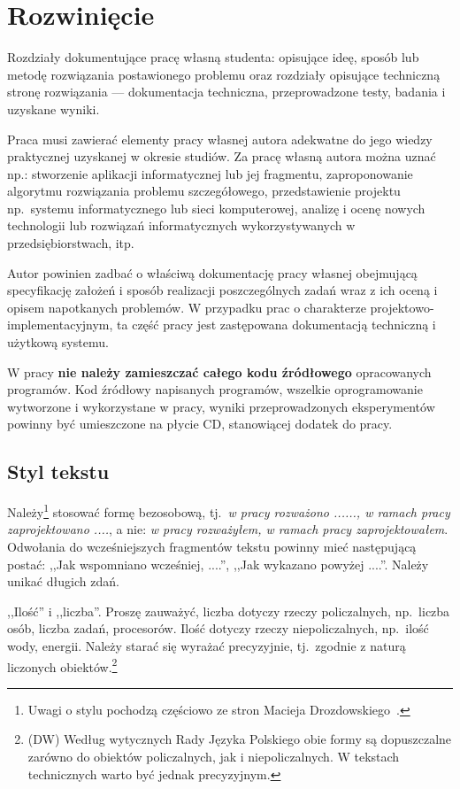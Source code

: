\chapter{Rozwinięcie}

Rozdziały dokumentujące pracę własną studenta: opisujące ideę, sposób lub metodę
rozwiązania postawionego problemu oraz rozdziały opisujące techniczną stronę rozwiązania
--- dokumentacja techniczna, przeprowadzone testy, badania i uzyskane wyniki.

Praca musi zawierać elementy pracy własnej autora adekwatne do jego wiedzy praktycznej uzyskanej w
okresie studiów. Za pracę własną autora można uznać np.: stworzenie aplikacji informatycznej lub jej
fragmentu, zaproponowanie algorytmu rozwiązania problemu szczegółowego, przedstawienie projektu
np.~systemu informatycznego lub sieci komputerowej, analizę i ocenę nowych technologii lub rozwiązań
informatycznych wykorzystywanych w przedsiębiorstwach, itp.

Autor powinien zadbać o właściwą dokumentację pracy własnej obejmującą specyfikację założeń i
sposób realizacji poszczególnych zadań
wraz z ich oceną i opisem napotkanych problemów. W przypadku prac o charakterze
projektowo-implementacyjnym, ta część pracy jest zastępowana dokumentacją techniczną i użytkową systemu.

W pracy \textbf{nie należy zamieszczać całego kodu źródłowego} opracowanych programów. Kod źródłowy napisanych
programów, wszelkie oprogramowanie wytworzone i wykorzystane w pracy, wyniki przeprowadzonych
eksperymentów powinny być umieszczone na płycie CD, stanowiącej dodatek do pracy.

\section*{Styl tekstu}

Należy\footnote{Uwagi o stylu pochodzą częściowo ze stron Macieja Drozdowskiego~\cite{mdro}.}
stosować formę bezosobową, tj.~\emph{w pracy rozważono ......,
w ramach pracy zaprojektowano ....}, a nie: \emph{w pracy rozważyłem, w ramach pracy zaprojektowałem}.
Odwołania do wcześniejszych fragmentów tekstu powinny mieć następującą postać: ,,Jak wspomniano wcześniej, ....'',
,,Jak wykazano powyżej ....''. Należy unikać długich zdań.

,,Ilość'' i ,,liczba''. Proszę zauważyć, liczba dotyczy rzeczy policzalnych, np.~liczba osób, liczba zadań, procesorów.
Ilość dotyczy rzeczy niepoliczalnych, np.~ilość wody, energii. Należy starać się wyrażać precyzyjnie, tj.~zgodnie
z naturą liczonych obiektów.\footnote{(DW) Według wytycznych Rady Języka Polskiego obie formy są dopuszczalne
zarówno do obiektów policzalnych, jak i niepoliczalnych. W tekstach technicznych warto być jednak precyzyjnym.}

